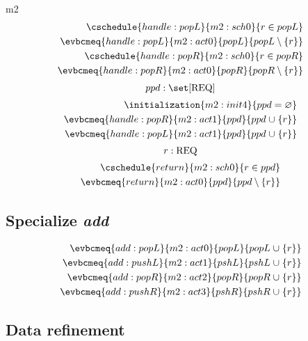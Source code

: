 \documentclass[12pt]{amsart}
\newcommand{\REQ}{\text{REQ}}
\begin{document}
\begin{machine}{m2}
\begin{align}
    \cschedule{handle:popL}{m2:sch0}{ r \in popL } \\
    \evbcmeq{handle:popL}{m2:act0}{popL}{popL \setminus \{ r \}} \\
    \cschedule{handle:popR}{m2:sch0}{ r \in popR } \\
    \evbcmeq{handle:popR}{m2:act0}{popR}{popR \setminus \{ r \}} 
  \end{align}
  \[ \variable{ ppd : \set [\REQ] } \]
  \begin{align}
    \initialization{m2:init4}{ ppd = \emptyset } \\
    \evbcmeq{handle:popR}{m2:act1}{ppd}{ ppd \bunion \{r\} } \\
    \evbcmeq{handle:popL}{m2:act1}{ppd}{ ppd \bunion \{r\} }
  \end{align}
  \[ \indices{return}{ r : \REQ } \]
  \begin{align}
    \cschedule{return}{m2:sch0}{ r \in ppd } \\
    \evbcmeq{return}{m2:act0}{ppd}{ ppd \setminus \{ r \} }
  \end{align}
\subsection{Specialize \emph{add}}
  \begin{align}
    \evbcmeq{add:popL}{m2:act0}{popL}{popL \bunion \{r\}} \\
    \evbcmeq{add:pushL}{m2:act1}{pshL}{pshL \bunion \{r\}} \\
    \evbcmeq{add:popR}{m2:act2}{popR}{popR \bunion \{r\}} \\
    \evbcmeq{add:pushR}{m2:act3}{pshR}{pshR \bunion \{r\}} 
  \end{align}
\subsection{Data refinement}
\end{machine}
  \newcommand{\OBJ}{\text{OBJ}}
\end{document}
